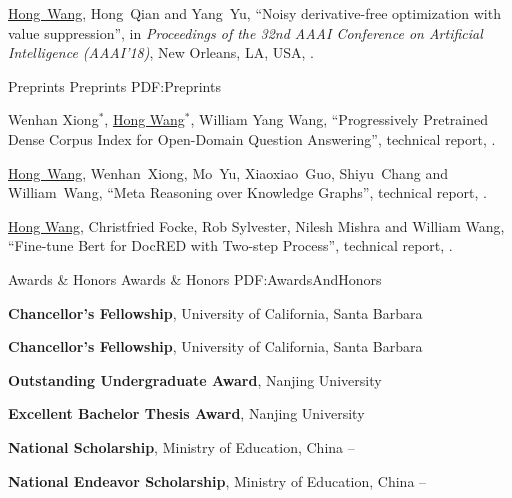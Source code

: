 \documentclass[letterpaper,MMMyyyy,nonstopmode]{simpleresumecv}
\begin{document}
\begin{Body}
\begin{enumerate}[label={[\arabic*]~~}]
\item
\underline{Hong~Wang}, Hong~Qian and Yang~Yu,
``Noisy derivative-free optimization with value suppression'',
in \textit{Proceedings of the 32nd AAAI Conference on Artificial Intelligence (AAAI’18)},
New Orleans, LA, USA,
.

\end{enumerate}

\BigGap
\SubSection
{Preprints}
{Preprints}
{PDF:Preprints}
\begin{enumerate}[label={[\arabic*]~~}]
\item
Wenhan Xiong$^*$, \underline{Hong Wang}$^*$, William Yang Wang,
``Progressively Pretrained Dense Corpus Index for Open-Domain Question Answering'',
technical report,
.

\item
\underline{Hong~Wang}, Wenhan~Xiong, Mo~Yu, Xiaoxiao~Guo, Shiyu~Chang and William~Wang,
``Meta Reasoning over Knowledge Graphs'',
technical report,
.

\item
\underline{Hong Wang}, Christfried Focke, Rob Sylvester, Nilesh Mishra and William Wang,
``Fine-tune Bert for DocRED with Two-step Process'',
technical report,
.

\end{enumerate}



\Section
{Awards \&\newline
Honors}
{Awards \& Honors}
{PDF:AwardsAndHonors}

\Entry
\textbf{Chancellor's Fellowship}, University of California, Santa Barbara
\hfill
{}

\Gap
\Entry
\textbf{Chancellor's Fellowship}, University of California, Santa Barbara
\hfill
{}

\Gap
\Entry
\textbf{Outstanding Undergraduate Award}, Nanjing University
\hfill
{}

\Gap
\Entry
\textbf{Excellent Bachelor Thesis Award}, Nanjing University
\hfill
{}

\Gap
\Entry
\textbf{National Scholarship}, Ministry of Education, China
\hfill
{} -- 

\Gap
\Entry
\textbf{National Endeavor Scholarship}, Ministry of Education, China
\hfill
{} -- 


\end{Body}
\end{document}
